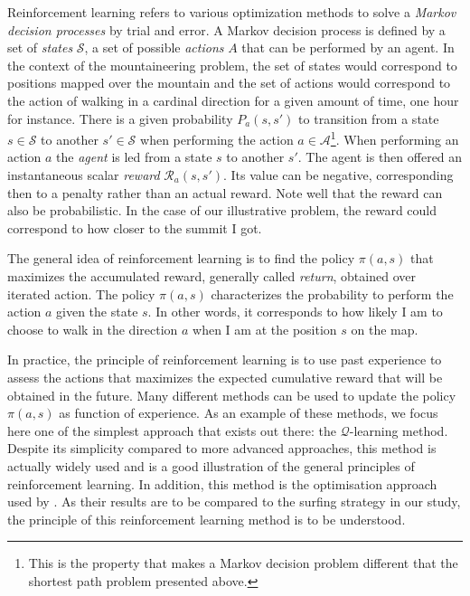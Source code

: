 Reinforcement learning refers to various optimization methods to solve a \textit{Markov decision processes} by trial and error. 
A Markov decision process is defined by a set of \textit{states} $\mathcal{S}$, a set of possible \textit{actions} $A$ that can be performed by an agent.
In the context of the mountaineering problem, the set of states would correspond to positions mapped over the mountain and the set of actions would correspond to the action of walking in a cardinal direction for a given amount of time, one hour for instance.
There is a given probability $P_a(s, s')$ to transition from a state $s \in \mathcal{S}$ to another $s' \in \mathcal{S}$ when performing the action $a \in \mathcal{A}$\footnote{This is the property that makes a Markov decision problem different that the shortest path problem presented above.}.
When performing an action $a$ the \textit{agent} is led from a state $s$ to another $s'$.
The agent is then offered an instantaneous scalar \textit{reward} $\mathcal{R}_a(s, s')$.
Its value can be negative, corresponding then to a penalty rather than an actual reward.
Note well that the reward can also be probabilistic.
In the case of our illustrative problem, the reward could correspond to how closer to the summit I got.

The general idea of reinforcement learning is to find the policy $\pi(a, s)$ that maximizes the accumulated reward, generally called \textit{return}, obtained over iterated action.
The policy $\pi(a, s)$ characterizes the probability to perform the action $a$ given the state $s$.
In other words, it corresponds to how likely I am to choose to walk in the direction $a$ when I am at the position $s$ on the map.

In practice, the principle of reinforcement learning is to use past experience to assess the actions that maximizes the expected cumulative reward that will be obtained in the future.
Many different methods can be used to update the policy $\pi(a, s)$ as function of experience.
As an example of these methods, we focus here one of the simplest approach that exists out there: the $\mathcal{Q}$-learning method.
Despite its simplicity compared to more advanced approaches, this method is actually widely used and is a good illustration of the general principles of reinforcement learning.
In addition, this method is the optimisation approach used by \citep{alageshan2020machine}.
As their results are to be compared to the surfing strategy in our study, the principle of this reinforcement learning method is to be understood. 

